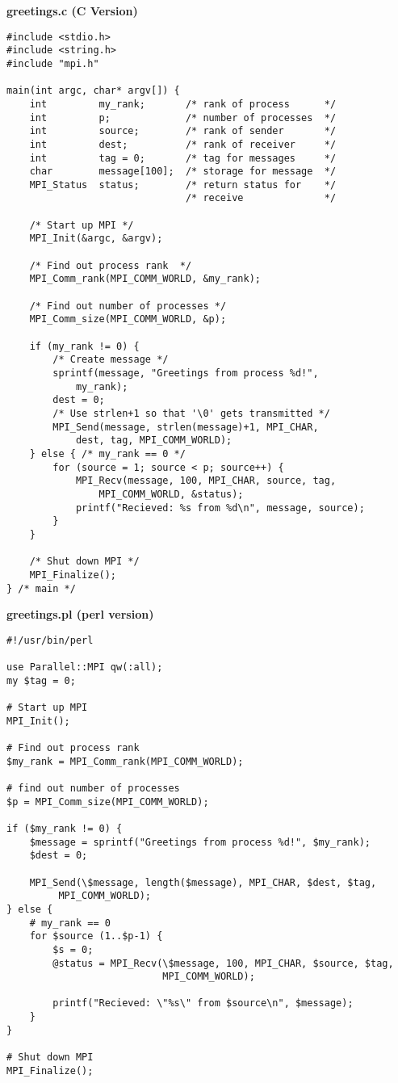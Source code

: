 \documentclass{report}
\begin{document}
\begin{center} \bf{greetings.c} (C Version)\end{center}
\begin{verbatim}
#include <stdio.h>
#include <string.h>
#include "mpi.h"

main(int argc, char* argv[]) {
    int         my_rank;       /* rank of process      */
    int         p;             /* number of processes  */
    int         source;        /* rank of sender       */
    int         dest;          /* rank of receiver     */
    int         tag = 0;       /* tag for messages     */
    char        message[100];  /* storage for message  */
    MPI_Status  status;        /* return status for    */
                               /* receive              */
   
    /* Start up MPI */
    MPI_Init(&argc, &argv);

    /* Find out process rank  */
    MPI_Comm_rank(MPI_COMM_WORLD, &my_rank);

    /* Find out number of processes */
    MPI_Comm_size(MPI_COMM_WORLD, &p);

    if (my_rank != 0) {
        /* Create message */
        sprintf(message, "Greetings from process %d!",
            my_rank);
        dest = 0;
        /* Use strlen+1 so that '\0' gets transmitted */
        MPI_Send(message, strlen(message)+1, MPI_CHAR, 
            dest, tag, MPI_COMM_WORLD);
    } else { /* my_rank == 0 */
        for (source = 1; source < p; source++) {
            MPI_Recv(message, 100, MPI_CHAR, source, tag, 
                MPI_COMM_WORLD, &status);
            printf("Recieved: %s from %d\n", message, source);
        }
    }

    /* Shut down MPI */
    MPI_Finalize();
} /* main */
\end{verbatim}

\begin{center} \bf{greetings.pl} (perl version) \end{center}
\begin{verbatim}
#!/usr/bin/perl 

use Parallel::MPI qw(:all);
my $tag = 0;

# Start up MPI
MPI_Init();

# Find out process rank
$my_rank = MPI_Comm_rank(MPI_COMM_WORLD);

# find out number of processes
$p = MPI_Comm_size(MPI_COMM_WORLD);

if ($my_rank != 0) {
    $message = sprintf("Greetings from process %d!", $my_rank);
    $dest = 0;
    
    MPI_Send(\$message, length($message), MPI_CHAR, $dest, $tag,
	     MPI_COMM_WORLD);
} else { 
    # my_rank == 0
    for $source (1..$p-1) {
        $s = 0;
        @status = MPI_Recv(\$message, 100, MPI_CHAR, $source, $tag, 
                           MPI_COMM_WORLD);	
	
        printf("Recieved: \"%s\" from $source\n", $message);
    }
}

# Shut down MPI 
MPI_Finalize();
\end{verbatim}
\end{document}
